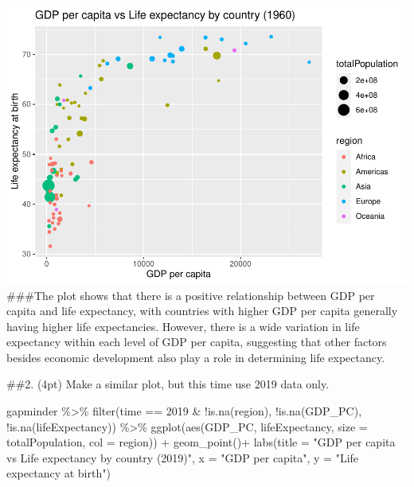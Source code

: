 \documentclass[
]{article}
\newenvironment{Shaded}{\begin{snugshade}}{\end{snugshade}}
\newcommand{\AttributeTok}[1]{\textcolor[rgb]{0.77,0.63,0.00}{#1}}
\newcommand{\DecValTok}[1]{\textcolor[rgb]{0.00,0.00,0.81}{#1}}
\newcommand{\FunctionTok}[1]{\textcolor[rgb]{0.00,0.00,0.00}{#1}}
\newcommand{\NormalTok}[1]{#1}
\newcommand{\SpecialCharTok}[1]{\textcolor[rgb]{0.00,0.00,0.00}{#1}}
\newcommand{\StringTok}[1]{\textcolor[rgb]{0.31,0.60,0.02}{#1}}
\begin{document}
\includegraphics{ps05-rmarkdown_files/figure-latex/unnamed-chunk-14-1.pdf}
\#\#\#The plot shows that there is a positive relationship between GDP
per capita and life expectancy, with countries with higher GDP per
capita generally having higher life expectancies. However, there is a
wide variation in life expectancy within each level of GDP per capita,
suggesting that other factors besides economic development also play a
role in determining life expectancy.

\#\#2. (4pt) Make a similar plot, but this time use 2019 data only.

\begin{Shaded}
\begin{Highlighting}[]
\NormalTok{gapminder }\SpecialCharTok{\%\textgreater{}\%}
  \FunctionTok{filter}\NormalTok{(time }\SpecialCharTok{==} \DecValTok{2019} \SpecialCharTok{\&} \SpecialCharTok{!}\FunctionTok{is.na}\NormalTok{(region),}
         \SpecialCharTok{!}\FunctionTok{is.na}\NormalTok{(GDP\_PC),}
         \SpecialCharTok{!}\FunctionTok{is.na}\NormalTok{(lifeExpectancy)) }\SpecialCharTok{\%\textgreater{}\%}
  \FunctionTok{ggplot}\NormalTok{(}\FunctionTok{aes}\NormalTok{(GDP\_PC, lifeExpectancy, }\AttributeTok{size =}\NormalTok{ totalPopulation, }\AttributeTok{col =}\NormalTok{ region)) }\SpecialCharTok{+}
    \FunctionTok{geom\_point}\NormalTok{()}\SpecialCharTok{+}
  \FunctionTok{labs}\NormalTok{(}\AttributeTok{title =} \StringTok{"GDP per capita vs Life expectancy by country (2019)"}\NormalTok{, }\AttributeTok{x =} \StringTok{"GDP per capita"}\NormalTok{, }\AttributeTok{y =} \StringTok{"Life expectancy at birth"}\NormalTok{)}
\end{Highlighting}
\end{Shaded}
\end{document}
